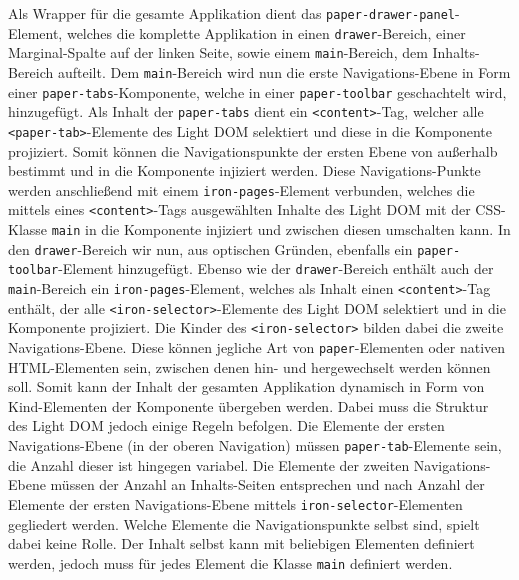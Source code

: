 Als Wrapper für die gesamte Applikation dient das \texttt{paper-drawer-panel}-Element, welches die komplette Applikation in einen \texttt{drawer}-Bereich, einer Marginal-Spalte auf der linken Seite, sowie einem \texttt{main}-Bereich, dem Inhalts-Bereich aufteilt. Dem \texttt{main}-Bereich wird nun die erste Navigations-Ebene in Form einer \texttt{paper-tabs}-Komponente, welche in einer \texttt{paper-toolbar} geschachtelt wird, hinzugefügt. Als Inhalt der \texttt{paper-tabs} dient ein \texttt{\textless{}content\textgreater{}}-Tag, welcher alle \texttt{\textless{}paper-tab\textgreater{}}-Elemente des Light \ac{DOM} selektiert und diese in die Komponente projiziert. Somit können die Navigationspunkte der ersten Ebene von außerhalb bestimmt und in die Komponente injiziert werden. Diese Navigations-Punkte werden anschließend mit einem \texttt{iron-pages}-Element verbunden, welches die mittels eines \texttt{\textless{}content\textgreater{}}-Tags ausgewählten Inhalte des Light \ac{DOM} mit der \ac{CSS}-Klasse \texttt{main} in die Komponente injiziert und zwischen diesen umschalten kann. In den \texttt{drawer}-Bereich wir nun, aus optischen Gründen, ebenfalls ein \texttt{paper-toolbar}-Element hinzugefügt. Ebenso wie der \texttt{drawer}-Bereich enthält auch der \texttt{main}-Bereich ein \texttt{iron-pages}-Element, welches als Inhalt einen \texttt{\textless{}content\textgreater{}}-Tag enthält, der alle \texttt{\textless{}iron-selector\textgreater{}}-Elemente des Light \ac{DOM} selektiert und in die Komponente projiziert. Die Kinder des \texttt{\textless{}iron-selector\textgreater{}} bilden dabei die zweite Navigations-Ebene. Diese können jegliche Art von \texttt{paper}-Elementen oder nativen \ac{HTML}-Elementen sein, zwischen denen hin- und hergewechselt werden können soll. Somit kann der Inhalt der gesamten Applikation dynamisch in Form von Kind-Elementen der Komponente übergeben werden. Dabei muss die Struktur des Light \ac{DOM} jedoch einige Regeln befolgen. Die Elemente der ersten Navigations-Ebene (in der oberen Navigation) müssen \texttt{paper-tab}-Elemente sein, die Anzahl dieser ist hingegen variabel. Die Elemente der zweiten Navigations-Ebene müssen der Anzahl an Inhalts-Seiten entsprechen und nach Anzahl der Elemente der ersten Navigations-Ebene mittels \texttt{iron-selector}-Elementen gegliedert werden. Welche Elemente die Navigationspunkte selbst sind, spielt dabei keine Rolle. Der Inhalt selbst kann mit beliebigen Elementen definiert werden, jedoch muss für jedes Element die Klasse \texttt{main} definiert werden.

